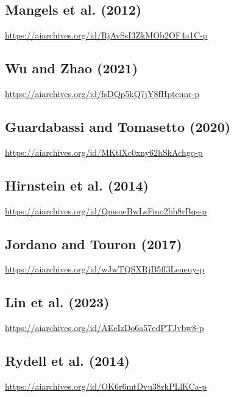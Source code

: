 \documentclass[
  doc, a4paper]{apa7}
\begin{document}
\subsection{Mangels et al. (2012)}\label{mangelsemotionblockspath2012}

\url{https://aiarchives.org/id/RjAvSsI3ZkMOb2OF4a1C-p}

\subsection{Wu and Zhao (2021)}\label{wudegreecentralitybrain2021}

\url{https://aiarchives.org/id/fsDQp5kQ7jY8fHpteimr-p}

\subsection{Guardabassi and Tomasetto (2020)}\label{guardabassiweightstatusweight2020}

\url{https://aiarchives.org/id/MKtlXc0xny62hSkAchgq-p}

\subsection{Hirnstein et al. (2014)}\label{hirnsteingenderstereotypingcognitivesex2014}

\url{https://aiarchives.org/id/QmsoeBwLsFmo2bh8rBqs-p}

\subsection{Jordano and Touron (2017)}\label{jordanoprimingperformancerelatedconcerns2017}

\url{https://aiarchives.org/id/wJwTQSXRjB5ff3Lsueuy-p}

\subsection{Lin et al. (2023)}\label{lineffectstereotypethreat2023a}

\url{https://aiarchives.org/id/AEeIzDo6a57edPTJvbw8-p}

\subsection{Rydell et al. (2014)}\label{rydellstereotypethreatexecutive2014}

\url{https://aiarchives.org/id/OK6r6mtDvu38rkPLlKCa-p}
\end{document}
